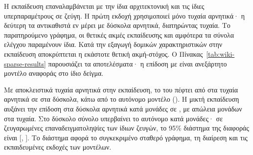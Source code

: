 Η εκπαίδευση επαναλαμβάνεται με την ίδια αρχιτεκτονική και τις ίδιες
υπερπαραμέτρους σε \WsTrainPairs{} ζεύγη. Η πρώτη εκδοχή χρησιμοποιεί μόνο
τυχαία αρνητικά· η δεύτερη τα αντικαθιστά εν μέρει με
\WsMixedHardTrainNegatives{} δύσκολα αρνητικά, διατηρώντας
\WsMixedRandomTrainNegatives{} τυχαία. Το παρατηρούμενο γράφημα, οι θετικές
ακμές εκπαίδευσης και αμφότερα τα σύνολα ελέγχου παραμένουν ίδια.
Κατά την εξαγωγή δομικών χαρακτηριστικών στην εκπαίδευση αποκρύπτεται η
εκάστοτε θετική ακμή-στόχος. Ο Πίνακας~\ref{tab:wiki-sparse-results}
παρουσιάζει τα αποτελέσματα· η επίδοση με  είναι ανεξάρτητο
μοντέλο αναφοράς στο ίδιο δείγμα.

\begin{table}[htbp]
  \centering
  \small
  \caption{Έλεγχος στο αραιό παρατηρούμενο γράφημα. Οι δύο εκδοχές εκπαίδευσης
  αξιολογούνται στα ίδια σταθερά σύνολα ελέγχου, με κοινές παρακρατημένες
  θετικές ακμές αλλά διαφορετική δειγματοληψία αρνητικών.}
  \label{tab:wiki-sparse-results}
\end{table}

Με αποκλειστικά τυχαία αρνητικά στην εκπαίδευση, το  του
 πέφτει από \WsRandomRandomCascadeFone{} στα τυχαία αρνητικά
σε \WsRandomHardCascadeFone{} στα δύσκολα, κάτω από το αυτόνομο μοντέλο
 (\WsRandomHardEmbeddingFone{}).
Η μικτή εκπαίδευση αυξάνει την επίδοση στα δύσκολα αρνητικά κατά
\WsHardGain{} μονάδες σε \WsMixedHardCascadeFone{}, με απώλεια
\WsRandomCost{} μονάδων στα τυχαία. Στο δύσκολο σύνολο υπερβαίνει το
αυτόνομο  κατά \WsMixedHardDeltaEmbedding{} μονάδες· σε
\WsBootstrapResamples{} ζευγαρωμένες επαναδειγματοληψίες των ίδιων ζευγών,
το 95\% διάστημα της διαφοράς είναι
[\WsMixedHardDeltaEmbeddingCiLow{}, \WsMixedHardDeltaEmbeddingCiHigh{}].
Το διάστημα αφορά το συγκεκριμένο σταθερό γράφημα, τη διαίρεση και τις
εκπαιδευμένες εκδοχές των μοντέλων.


